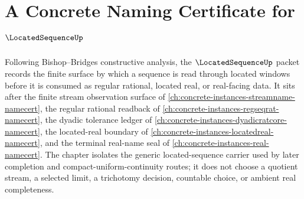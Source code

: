 \chapter{A Concrete Naming Certificate for $\LocatedSequenceUp$}
\label{ch:concrete-instances-locatedsequence-namecert}

Following Bishop--Bridges constructive analysis, the $\LocatedSequenceUp$ packet records the finite surface by which a sequence is read through located windows before it is consumed as regular rational, located real, or real-facing data. It sits after the finite stream observation surface of \autoref{ch:concrete-instances-streamname-namecert}, the regular rational readback of \autoref{ch:concrete-instances-regseqrat-namecert}, the dyadic tolerance ledger of \autoref{ch:concrete-instances-dyadicratcore-namecert}, the located-real boundary of \autoref{ch:concrete-instances-locatedreal-namecert}, and the terminal real-name seal of \autoref{ch:concrete-instances-real-namecert}. The chapter isolates the generic located-sequence carrier used by later completion and compact-uniform-continuity routes; it does not choose a quotient stream, a selected limit, a trichotomy decision, countable choice, or ambient real completeness.

